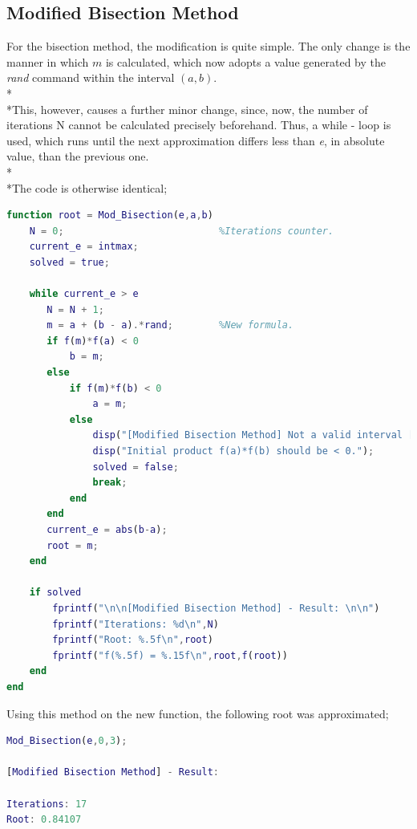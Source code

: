 \documentclass{article}
\begin{document}
\subsection{Modified Bisection Method}
For the bisection method, the modification is quite simple. The only change is the manner in which $m$ is calculated, which now adopts a value generated by the \emph{rand} command within the interval $(a,b)$.
\\*\\*This, however, causes a further minor change, since, now, the number of iterations N cannot be calculated precisely beforehand. Thus, a while - loop is used, which runs until the next approximation differs less than \emph{e}, in absolute value, than the previous one.
\\*\\*The code is otherwise identical;
\begin{lstlisting}[language=Matlab]
function root = Mod_Bisection(e,a,b)
    N = 0;                           %Iterations counter.
    current_e = intmax;
    solved = true;

    while current_e > e
       N = N + 1;
       m = a + (b - a).*rand;        %New formula.
       if f(m)*f(a) < 0
           b = m;
       else
           if f(m)*f(b) < 0
               a = m;
           else
               disp("[Modified Bisection Method] Not a valid interval [a,b].");
               disp("Initial product f(a)*f(b) should be < 0.");
               solved = false;
               break;
           end
       end
       current_e = abs(b-a);
       root = m;
    end

    if solved
        fprintf("\n\n[Modified Bisection Method] - Result: \n\n")   
        fprintf("Iterations: %d\n",N)                
        fprintf("Root: %.5f\n",root)     
        fprintf("f(%.5f) = %.15f\n",root,f(root)) 
    end
end
\end{lstlisting}
Using this method on the new function, the following root was approximated;
\begin{lstlisting}[language=Matlab]
Mod_Bisection(e,0,3);

[Modified Bisection Method] - Result: 

Iterations: 17
Root: 0.84107
\end{lstlisting}
\pagebreak
\end{document}
